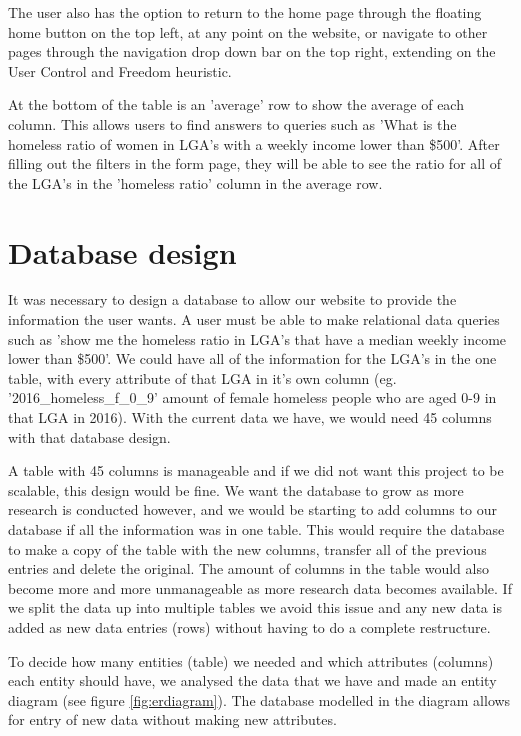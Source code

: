 \documentclass[12pt, a4paper]{article}
\begin{document}
The user also has the option to return to the home page through the floating home button on the top left, at any point on the website, or navigate to other pages through the navigation drop down bar on the top right, extending on the User Control and Freedom heuristic.

At the bottom of the table is an 'average' row to show the average of each column. This allows users to find answers to queries such as 'What is the homeless ratio of women in LGA's with a weekly income lower than \$500'. After filling out the filters in the form page, they will be able to see the ratio for all of the LGA's in the 'homeless ratio' column in the average row.
\section{Database design}
It was necessary to design a database to allow our website to provide the information the user wants. A user must be able to make relational data queries such as 'show me the homeless ratio in LGA's that have a median weekly income lower than \$500'. We could have all of the information for the LGA's in the one table, with every attribute of that LGA in it's own column (eg. '2016\_homeless\_f\_0\_9' amount of female homeless people who are aged 0-9 in that LGA in 2016). With the current data we have, we would need 45 columns with that database design. 

A table with 45 columns is manageable and if we did not want this project to be scalable, this design would be fine. We want the database to grow as more research is conducted however, and we would be starting to add columns to our database if all the information was in one table. This would require the database to make a copy of the table with the new columns, transfer all of the previous entries and delete the original. The amount of columns in the table would also become more and more unmanageable as more research data becomes available. If we split the data up into multiple tables we avoid this issue and any new data is added as new data entries (rows) without having to do a complete restructure.

To decide how many entities (table) we needed and which attributes (columns) each entity should have, we analysed the data that we have and made an entity diagram (see figure \ref{fig:erdiagram}). The database modelled in the diagram allows for entry of new data without making new attributes. 
\end{document}
